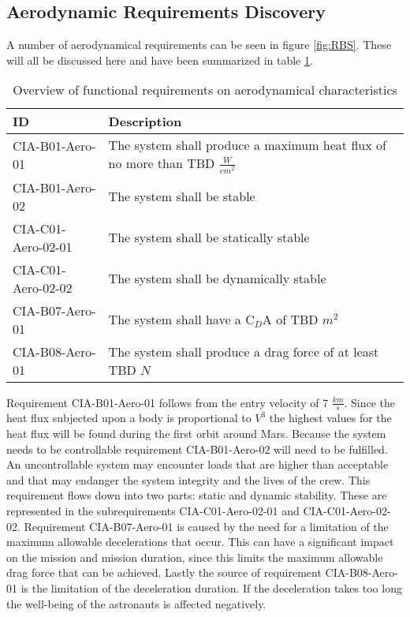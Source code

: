 \subsection{Aerodynamic Requirements Discovery} 
\label{sec:aero}
A number of aerodynamical requirements can be seen in figure \ref{fig:RBS}. These will all be discussed here and have been summarized in table \ref{tab:aeroreqs}. 


\begin{table}[h]
	\caption{Overview of functional requirements on aerodynamical characteristics}
	\label{tab:aeroreqs}
	\begin{tabular}{|p{}|p{}|}
		\hline
		ID & Description \\
		\hline \hline
		CIA-B01-Aero-01 & The system shall produce a maximum heat flux of no more than TBD $\frac{W}{cm^{2}}$ \\ \hline
		CIA-B01-Aero-02 & The system shall be stable \\ \hline
		CIA-C01-Aero-02-01 & The system shall be statically stable \\ \hline
		CIA-C01-Aero-02-02 & The system shall be dynamically stable \\ \hline
		CIA-B07-Aero-01 & The system shall have a C$_{D}$A of TBD $m^{2}$ \\ \hline
		CIA-B08-Aero-01 & The system shall produce a drag force of at least TBD $N$ \\ \hline
	\end{tabular}
\end{table}

Requirement CIA-B01-Aero-01 follows from the entry velocity of 7 $\frac{km}{s}$. Since the heat flux subjected upon a body is proportional to $V^{3}$ \cite{Tauber1986} the highest values for the heat flux will be found during the first orbit around Mars. 
Because the system needs to be controllable requirement CIA-B01-Aero-02 will need to be fulfilled. An uncontrollable system may encounter loads that are higher than acceptable and that may endanger the system integrity and the lives of the crew. This requirement flows down into two parts: static and dynamic stability. These are represented in the subrequirements CIA-C01-Aero-02-01 and CIA-C01-Aero-02-02.
Requirement CIA-B07-Aero-01 is caused by the need for a limitation of the maximum allowable decelerations that occur. This can have a significant impact on the mission and mission duration, since this limits the maximum allowable drag force that can be achieved.
Lastly the source of requirement CIA-B08-Aero-01 is the limitation of the deceleration duration. If the deceleration takes too long the well-being of the astronauts is affected negatively.